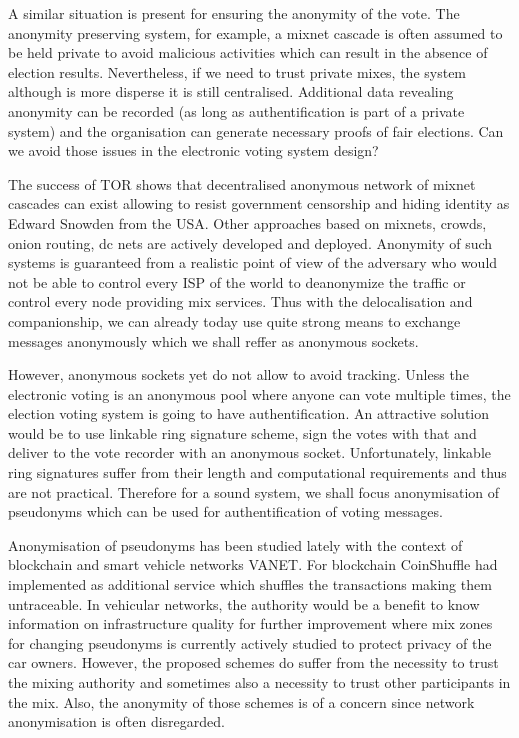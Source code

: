 \documentclass[12pt,a4paper]{article}
\begin{document}
A similar situation is present for ensuring the anonymity of the vote. The anonymity preserving system, for example, a mixnet cascade is often assumed to be held private to avoid malicious activities which can result in the absence of election results. Nevertheless, if we need to trust private mixes, the system although is more disperse it is still centralised. Additional data revealing anonymity can be recorded (as long as authentification is part of a private system) and the organisation can generate necessary proofs of fair elections. Can we avoid those issues in the electronic voting system design?\par
The success of TOR shows that decentralised anonymous network of mixnet cascades can exist allowing to resist government censorship and hiding identity as Edward Snowden from the USA. Other approaches based on mixnets, crowds, onion routing, dc nets are actively developed and deployed. Anonymity of such systems is guaranteed from a realistic point of view of the adversary who would not be able to control every ISP of the world to deanonymize the traffic or control every node providing mix services. Thus with the delocalisation and companionship, we can already today use quite strong means to exchange messages anonymously which we shall reffer as anonymous sockets.\par
However, anonymous sockets yet do not allow to avoid tracking. Unless the electronic voting is an anonymous pool where anyone can vote multiple times, the election voting system is going to have authentification. An attractive solution would be to use linkable ring signature scheme, sign the votes with that and deliver to the vote recorder with an anonymous socket. Unfortunately, linkable ring signatures suffer from their length and computational requirements and thus are not practical. Therefore for a sound system, we shall focus anonymisation of pseudonyms which can be used for authentification of voting messages.\par
Anonymisation of pseudonyms has been studied lately with the context of blockchain and smart vehicle networks VANET. For blockchain CoinShuffle had implemented as additional service which shuffles the transactions making them untraceable. In vehicular networks, the authority would be a benefit to know information on infrastructure quality for further improvement where mix zones for changing pseudonyms is currently actively studied to protect privacy of the car owners. However, the proposed schemes do suffer from the necessity to trust the mixing authority and sometimes also a necessity to trust other participants in the mix. Also, the anonymity of those schemes is of a concern since network anonymisation is often disregarded.\par
\end{document}
